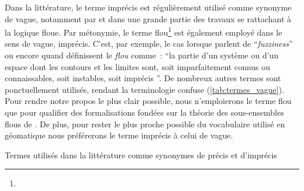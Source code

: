 Dans la littérature, le terme imprécis est régulièrement utilisé comme
synonyme de vague, notamment par \textcite{Zadeh1965} et dans une
grande partie des travaux se rattachant à la logique floue. Par
métonymie, le terme flou\footnote{} est également employé dans le sens
de vague, imprécis. C’est, par exemple, le cas lorsque
\textcite{Lagacherie1996} parlent de \enquote{\emph{fuzziness}} ou
encore quand \textcite[p. 218]{Brunet1992} définissent le \emph{flou}
comme : \enquote{la partie d’un système ou d’un espace dont les
  contours et les limites sont, soit imparfaitement connus ou
  connaissables, soit instables, soit imprécis \textelp{}}. De
nombreux autres termes sont ponctuellement utilisés, rendant la
terminologie confuse (\autoref{tab:termes_vague}). Pour rendre notre
propos le plus clair possible, nous n’emploierons le terme flou que
pour qualifier des formalisations fondées sur la théorie des
sous-ensembles flous de \textcite{Zadeh1965}. De plus, pour rester le
plus proche possible du vocabulaire utilisé en géomatique nous
préférerons le terme imprécis à celui de vague.

\begin{table}
  \centering
  
  \caption{Termes utilisés dans la littérature comme synonymes de
    précis et d’imprécis}
  \label{tab:termes_vague}
\end{table}

